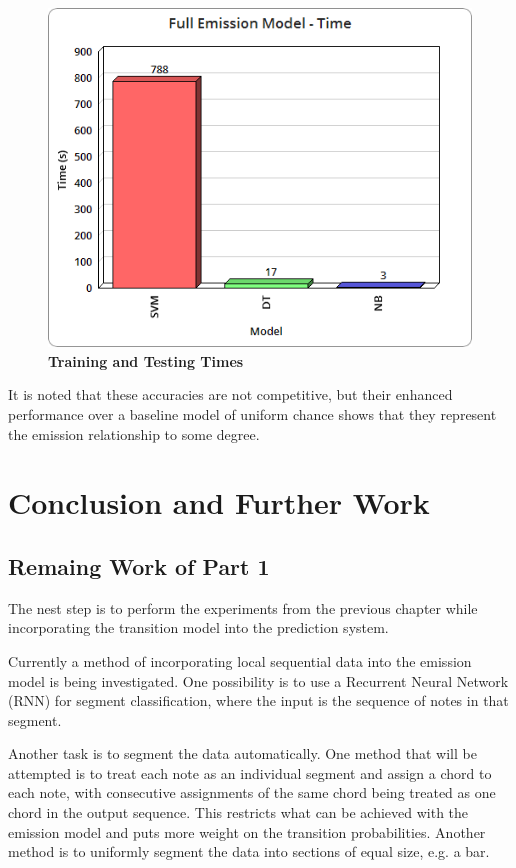 \documentclass[bsc,singlespacing,parskip,deptreport,twoside,frontabs]{infthesis}
\begin{document}
\begin{figure}
  \caption{\textbf{Training and Testing Times}}
  \centering
    \includegraphics[scale=0.5]{time}
\end{figure}

It is noted that these accuracies are not competitive, but their enhanced performance over a baseline model of uniform chance shows that they represent the emission relationship to some degree.

\chapter{Conclusion and Further Work}

\section{Remaing Work of Part 1}

The nest step is to perform the experiments from the previous chapter while incorporating the transition model into the prediction system.

Currently a method of incorporating local sequential data into the emission model is being investigated. One possibility is to use a Recurrent Neural Network (RNN) for segment classification, where the input is the sequence of notes in that segment.

Another task is to segment the data automatically. One method that will be attempted is to treat each note as an individual segment and assign a chord to each note, with consecutive assignments of the same chord being treated as one chord in the output sequence. This restricts what can be achieved with the emission model and puts more weight on the transition probabilities. Another method is to uniformly segment the data into sections of equal size, e.g. a bar.
\end{document}
